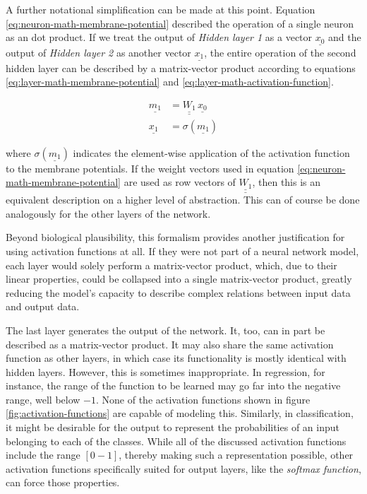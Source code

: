 \documentclass[11pt, a4paper]{article}
\newcommand\braces[1]{\left(#1\right)}
\renewcommand{\vec}[1]{\underline{#1}}
\newcommand{\mat}[1]{\underline{\underline{#1}}}
\begin{document}
A further notational simplification can be made at this point. Equation \eqref{eq:neuron-math-membrane-potential} described the operation of a single neuron as an dot product. If we treat the output of \emph{Hidden layer 1} as a vector $\vec{x_0}$ and the output of \emph{Hidden layer 2} as another vector $\vec{x_1}$, the entire operation of the second hidden layer can be described by a matrix-vector product according to equations \eqref{eq:layer-math-membrane-potential} and \eqref{eq:layer-math-activation-function}.

\begin{align}
	\vec{m_1} &= \mat{W_{1}} \, \vec{x_0} \label{eq:layer-math-membrane-potential} \\
	\vec{x_1} &= \sigma \braces{\vec{m_1}} \label{eq:layer-math-activation-function}
\end{align}

where $\sigma \braces{\vec{m_1}}$ indicates the element-wise application of the activation function to the membrane potentials. If the weight vectors used in equation \eqref{eq:neuron-math-membrane-potential} are used as row vectors of $\mat{W_1}$, then this is an equivalent description on a higher level of abstraction. This can of course be done analogously for the other layers of the network.

Beyond biological plausibility, this formalism provides another justification for using activation functions at all. If they were not part of a neural network model, each layer would solely perform a matrix-vector product, which, due to their linear properties, could be collapsed into a single matrix-vector product, greatly reducing the model's capacity to describe complex relations between input data and output data.

The last layer generates the output of the network. It, too, can in part be described as a matrix-vector product. It may also share the same activation function as other layers, in which case its functionality is mostly identical with hidden layers. However, this is sometimes inappropriate. In regression, for instance, the range of the function to be learned may go far into the negative range, well below $-1$. None of the activation functions shown in figure \ref{fig:activation-functions} are capable of modeling this. Similarly, in classification, it might be desirable for the output to represent the probabilities of an input belonging to each of the classes. While all of the discussed activation functions include the range $[0-1]$, thereby making such a representation possible, other activation functions specifically suited for output layers, like the \emph{softmax function}, can force those properties.
\end{document}
